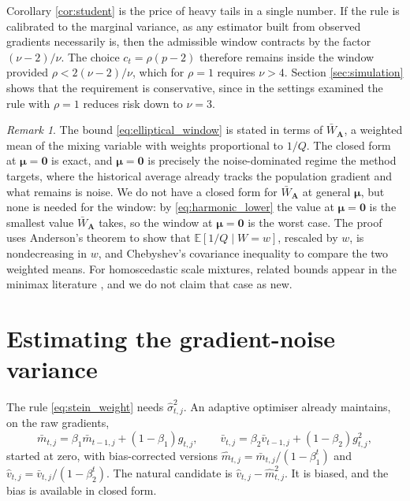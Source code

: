 \documentclass[a4paper,fleqn]{cas-sc}
\theoremstyle{plain}
\theoremstyle{definition}
\theoremstyle{remark}
\newtheorem{remark}{Remark}
\newcommand{\rev}[1]{#1}
\newcommand{\E}{\mathbb{E}}
\begin{document}
Corollary \ref{cor:student} is the price of heavy tails in a single number. If the rule is calibrated to the marginal variance, as any estimator built from observed gradients necessarily is, then the admissible window contracts by the factor $(\nu-2)/\nu$. The choice $c_t=\rho(p-2)$ therefore remains inside the window provided $\rho<2(\nu-2)/\nu$, which for $\rho=1$ requires $\nu>4$. Section \ref{sec:simulation} shows that the requirement is conservative, since in the settings examined the rule with $\rho=1$ reduces risk down to $\nu=3$.

\begin{remark}
The bound \eqref{eq:elliptical_window} is stated in terms of $\bar W_{\bm A}$, a weighted mean of the mixing variable with weights proportional to $1/Q$. The closed form at $\bm\mu=\bm 0$ is exact, and $\bm\mu=\bm 0$ is precisely the noise-dominated regime the method targets, where the historical average already tracks the population gradient and what remains is noise. \rev{We do not have a closed form for $\bar W_{\bm A}$ at general $\bm\mu$, but none is needed for the window: by \eqref{eq:harmonic_lower} the value at $\bm\mu=\bm 0$ is the smallest value $\bar W_{\bm A}$ takes, so the window at $\bm\mu=\bm 0$ is the worst case. The proof uses Anderson's theorem \citep{anderson1955} to show that $\E[1/Q\mid W=w]$, rescaled by $w$, is nondecreasing in $w$, and Chebyshev's covariance inequality to compare the two weighted means. For homoscedastic scale mixtures, related bounds appear in the minimax literature \citep{strawderman1974, fourdrinier2018}, and we do not claim that case as new.}
\end{remark}

\section{Estimating the gradient-noise variance}
\label{sec:variance}

The rule \eqref{eq:stein_weight} needs $\hat\sigma^2_{t,j}$. An adaptive optimiser already maintains, on the raw gradients,
\begin{equation}
\label{eq:moments}
\bar m_{t,j}=\beta_1\bar m_{t-1,j}+(1-\beta_1)g_{t,j},
\qquad
\bar v_{t,j}=\beta_2\bar v_{t-1,j}+(1-\beta_2)g^2_{t,j},
\end{equation}
started at zero, with bias-corrected versions $\hat m_{t,j}=\bar m_{t,j}/(1-\beta_1^{t})$ and $\hat v_{t,j}=\bar v_{t,j}/(1-\beta_2^{t})$. The natural candidate is $\hat v_{t,j}-\hat m^2_{t,j}$. It is biased, and the bias is available in closed form.
\end{document}
